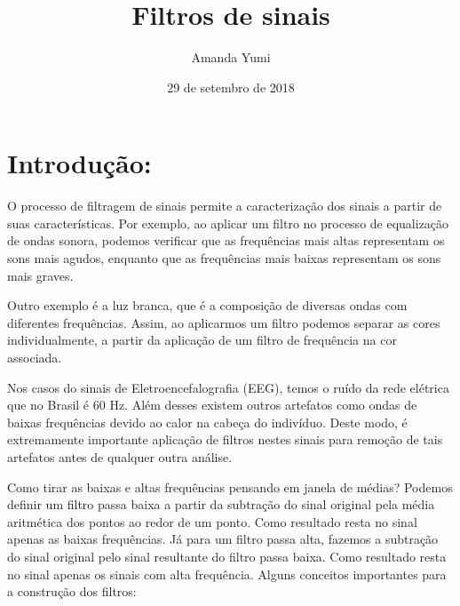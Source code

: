 \documentclass[]{article}
\title{Filtros de sinais}
\author{Amanda Yumi}
\date{29 de setembro de 2018}
\begin{document}
\maketitle

\section{Introdução:}\label{introducao}

O processo de filtragem de sinais permite a caracterização dos sinais a
partir de suas características. Por exemplo, ao aplicar um filtro no
processo de equalização de ondas sonora, podemos verificar que as
frequências mais altas representam os sons mais agudos, enquanto que as
frequências mais baixas representam os sons mais graves.

Outro exemplo é a luz branca, que é a composição de diversas ondas com
diferentes frequências. Assim, ao aplicarmos um filtro podemos separar
as cores individualmente, a partir da aplicação de um filtro de
frequência na cor associada.

Nos casos do sinais de Eletroencefalografia (EEG), temos o ruído da rede
elétrica que no Brasil é 60 Hz. Além desses existem outros artefatos
como ondas de baixas frequências devido ao calor na cabeça do indivíduo.
Deste modo, é extremamente importante aplicação de filtros nestes sinais
para remoção de tais artefatos antes de qualquer outra análise.

Como tirar as baixas e altas frequências pensando em janela de médias?
Podemos definir um filtro passa baixa a partir da subtração do sinal
original pela média aritmética dos pontos ao redor de um ponto. Como
resultado resta no sinal apenas as baixas frequências. Já para um filtro
passa alta, fazemos a subtração do sinal original pelo sinal resultante
do filtro passa baixa. Como resultado resta no sinal apenas os sinais
com alta frequência. Alguns conceitos importantes para a construção dos
filtros:
\end{document}
